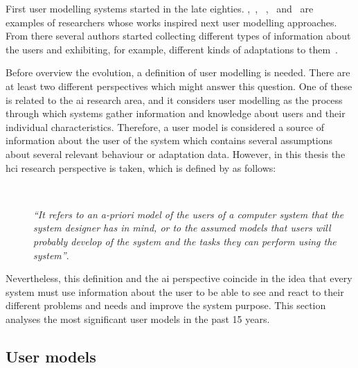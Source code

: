 First user modelling systems started in the late eighties. 
\citet{allen_plan_based_1979},~\citet{cohen_elements_1979}, 
~\citet{perrault_speech_1978},~\citet{rich_building_1979} 
and~\citep{rich_user_1979} are examples of researchers whose works inspired next 
user modelling approaches. From there several authors started collecting 
different types of information about the users and exhibiting, for example, 
different kinds of adaptations to them~\citep{kobsa_generic_2001}.

Before overview the evolution, a definition of user modelling is needed. There 
are at least two different perspectives which might answer this question. One of 
these is related to the \ac{ai} research area, and it considers user modelling 
as the process through which systems gather information and knowledge about 
users and their individual characteristics. Therefore, a user model is considered 
a source of information about the user of the system which contains several
assumptions about several relevant behaviour or adaptation data. However, in
this thesis the \ac{hci} research perspective is taken, which is defined by
\citet{pohl_logic_based_1999} as follows:

\begin{description}
  \item[] \hfill \\
  \begin{mdframed}[hidealllines=true,backgroundcolor=gray!20]
  \textit{``It refers to an a-priori model of the users of a computer system that the system
  designer has in mind, or to the assumed models that users will probably develop
  of the system and the tasks they can perform using the system''}.
  \end{mdframed}
\end{description}

Nevertheless, this definition and the \ac{ai} perspective coincide in the idea that 
every system must use information about the user to be able to see and react to 
their different problems and needs and improve the system purpose. This section 
analyses the most significant user models in the past 15 years.

\subsection{User models}
\label{sec:user_models}


















